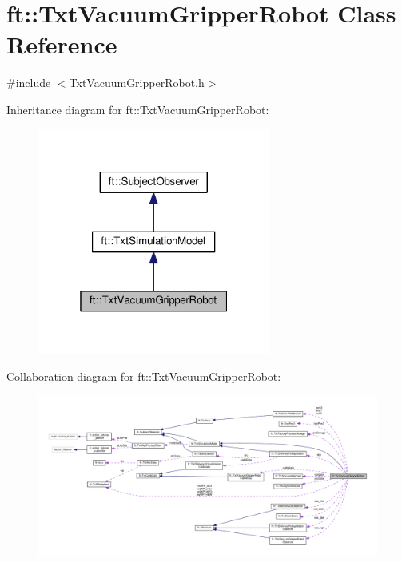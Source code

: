 \hypertarget{classft_1_1_txt_vacuum_gripper_robot}{}\section{ft\+:\+:Txt\+Vacuum\+Gripper\+Robot Class Reference}
\label{classft_1_1_txt_vacuum_gripper_robot}


{\ttfamily \#include $<$Txt\+Vacuum\+Gripper\+Robot.\+h$>$}



Inheritance diagram for ft\+:\+:Txt\+Vacuum\+Gripper\+Robot\+:
\nopagebreak
\begin{figure}[H]
\begin{center}
\leavevmode
\includegraphics[width=217pt]{classft_1_1_txt_vacuum_gripper_robot__inherit__graph}
\end{center}
\end{figure}


Collaboration diagram for ft\+:\+:Txt\+Vacuum\+Gripper\+Robot\+:
\nopagebreak
\begin{figure}[H]
\begin{center}
\leavevmode
\includegraphics[width=350pt]{classft_1_1_txt_vacuum_gripper_robot__coll__graph}
\end{center}
\end{figure}
